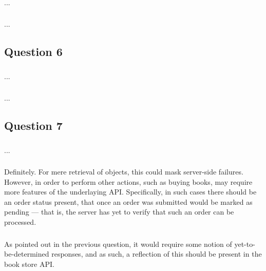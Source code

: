 \subsubsection{}
...

\subsubsection{}
...

\subsection{Question 6}

\subsubsection{}
...

\subsubsection{}
...

\subsection{Question 7}

\subsubsection{}
...

\subsubsection{}
Definitely. For mere retrieval of objects, this could mask server-side
failures. However, in order to perform other actions, such as buying books,
may require more features of the underlaying API. Specifically, in such cases
there should be an order status present, that once an order was submitted would
be marked as pending --- that is, the server has yet to verify that such an
order can be processed.

\subsubsection{}
As pointed out in the previous question, it would require some notion of
yet-to-be-determined responses, and as such, a reflection of this should be
present in the book store API.


